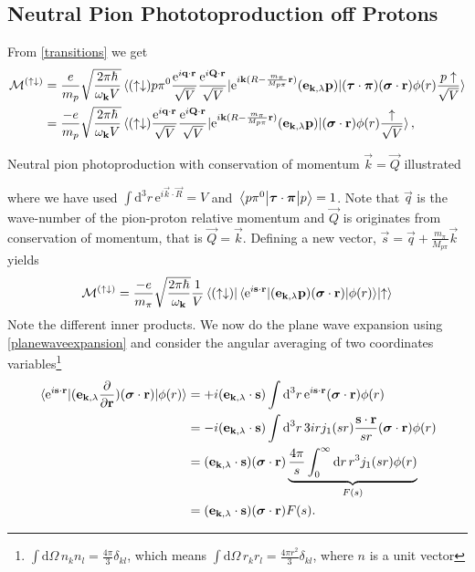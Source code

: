 \subsection{Neutral Pion Phototoproduction off Protons}
From \eqref{transitions} we get
\begin{align}\label{MatrixSpinupdown} 
	\mathcal{M}^{(\uparrow\downarrow)} & = \frac{e}{m_p} \sqrt{\frac{2\pi\hbar}{\omega_{\bm{\mathrm{k}}}V}} \mel*{(\uparrow\downarrow)p\pi^0 \frac{\text{e}^{i\bm{\mathrm{q}}\cdot \bm{\mathrm{r}}}}{\sqrt{V}}\frac{\text{e}^{i\bm{\mathrm{Q}}\cdot \bm{\mathrm{r}}}}{\sqrt{V}}}{\text{e}^{i\bm{\mathrm{k}}(R-\frac{m_\pi}{M_{p\pi}}\bm{\mathrm{r}})}(\bm{\mathrm{e}}_{\bm{\mathrm{k}},\lambda}\bm{\mathrm{p}})}{(\bm{\mathrm{\tau}}\cdot\bm{\mathrm{\pi}})(\bm{\mathrm{\sigma}}\cdot\bm{\mathrm{r}})\phi(r) \frac{p\uparrow}{\sqrt{V}}} \\
	&= \frac{-e}{m_p} \sqrt{\frac{2\pi\hbar}{\omega_{\bm{\mathrm{k}}}V}} \mel*{(\uparrow\downarrow) \frac{\text{e}^{i\bm{\mathrm{q}}\cdot \bm{\mathrm{r}}}}{\sqrt{V}}\frac{\text{e}^{i\bm{\mathrm{Q}}\cdot \bm{\mathrm{r}}}}{\sqrt{V}}}{\text{e}^{i\bm{\mathrm{k}}(R-\frac{m_\pi}{M_{p\pi}}\bm{\mathrm{r}})}(\bm{\mathrm{e}}_{\bm{\mathrm{k}},\lambda}\bm{\mathrm{p}})}{(\bm{\mathrm{\sigma}}\cdot\bm{\mathrm{r}})\phi(r) \frac{\uparrow}{\sqrt{V}}} \label{MatrixSpinupdown2},
\end{align} 
\begin{marginfigure}
	\centering
	
	\caption{Neutral pion photoproduction with conservation of momentum $\vec{k}=\vec{Q}$ illustrated}
	\label{qkenergy}
\end{marginfigure}
where we have used $\int \text{d}^3 r \, \text{e}^{i\vec{k}\cdot\vec{R}}=V$ and $\mel{p\pi^0}{\bm{\mathrm{\tau}}\cdot\bm{\mathrm{\pi}}}{p}=1$. Note that $\vec{q}$ is the wave-number of the pion-proton relative momentum and $\vec{Q}$ is originates from conservation of momentum, that is $\vec{Q}=\vec{k}$. Defining a new vector, $\vec{s}=\vec{q}+\frac{m_\pi}{M_{p\pi}}\vec{k}$ yields
\begin{equation}
    \mathcal{M}^{(\uparrow\downarrow)} = \frac{-e}{m_\pi} \sqrt{\frac{2\pi\hbar}{\omega_{\bm{\mathrm{k}}}}} \frac{1}{V} \mel*{(\uparrow \downarrow)}{\mel*{\text{e}^{i\bm{\mathrm{s}}\cdot\bm{\mathrm{r}}}}{(\bm{\mathrm{e}}_{\bm{\mathrm{k}},\lambda}\bm{\mathrm{p}})(\bm{\mathrm{\sigma}}\cdot\bm{\mathrm{r}})}{\phi(r)}}{\uparrow}
\end{equation}
Note the different inner products. We now do the plane wave expansion using \eqref{planewaveexpansion} and consider the angular averaging of two coordinates variables\footnote{$\int \text{d}\Omega \, n_k n_l =\frac{4\pi}{3}\delta_{kl}$, which means $\int \text{d}\Omega \, r_k r_l =\frac{4\pi r^2}{3}\delta_{kl}$, where $n$ is a unit vector}
\begin{align}
    \mel*{\text{e}^{i\bm{\mathrm{s}}\cdot\bm{\mathrm{r}}}}{(\bm{\mathrm{e}}_{\bm{\mathrm{k}},\lambda}\frac{\partial}{\partial \bm{\mathrm{r}}})(\bm{\mathrm{\sigma}}\cdot \bm{\mathrm{r}})}{\phi(r)} &=+i(\bm{\mathrm{e}}_{\bm{\mathrm{k}},\lambda}\cdot \bm{\mathrm{s}}) \int \text{d}^3 r \, \text{e}^{i\bm{\mathrm{s}}\cdot\bm{\mathrm{r}}}(\bm{\mathrm{\sigma}}\cdot \bm{\mathrm{r}}) \phi(r) \\ 
    &= -i(\bm{\mathrm{e}}_{\bm{\mathrm{k}},\lambda}\cdot \bm{\mathrm{s}}) \int \text{d}^3 r \, 3 i r j_1(sr) \frac{\bm{\mathrm{s}}\cdot \bm{\mathrm{r}}}{sr}(\bm{\mathrm{\sigma}}\cdot \bm{\mathrm{r}}) \phi(r) \\
    &= (\bm{\mathrm{e}}_{\bm{\mathrm{k}},\lambda}\cdot \bm{\mathrm{s}})(\bm{\mathrm{\sigma}}\cdot \bm{\mathrm{r}}) \underbrace{\frac{4\pi}{s} \int_0^\infty \text{d}r \, r^3 j_1(sr) \phi(r)}_{F(s)}  \\
    &= (\bm{\mathrm{e}}_{\bm{\mathrm{k}},\lambda}\cdot \bm{\mathrm{s}})(\bm{\mathrm{\sigma}}\cdot \bm{\mathrm{r}}) F(s).
\end{align}
